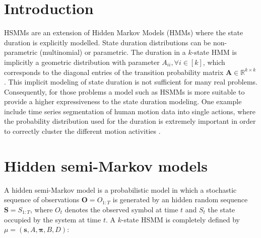 \documentclass[extendedabs]{recpad2k}
\begin{document}
\section{Introduction}
\label{sec:intro}
HSMMs are an extension of Hidden Markov Models (HMMs) where the state duration is explicitly modelled. State duration distributions can be non-parametric (multinomial) or parametric. The duration in a $k$-state HMM is implicitly a geometric distribution with parameter $A_{ii}, \forall{i\in [k]}$, which corresponds to the diagonal entries of the transition probability matrix $\boldsymbol{A}\in \mathbb{R}^{k\times k}$. %
This implicit modeling of state duration is not sufficient for many real problems. Consequently, for those problems a model such as HSMMs is more suitable to provide a higher expressiveness to the state duration modeling. One example include time series segmentation of human motion data into single actions, where the probability distribution used for the duration is extremely important in order to correctly cluster the different motion activities \cite{nakamura2017segmenting}. %
\vspace*{-2pt}
\section{Hidden semi-Markov models}
\label{sec:hsmm}
A hidden semi-Markov model is a probabilistic model in which a stochastic sequence of observations $\textbf{O}=O_{1:T}$ is generated by an hidden random sequence $\textbf{S} = S_{1:T}$, where $O_t$ denotes the observed symbol at time $t$ and $S_t$ the state occupied by the system at time $t$. A $k$-state HSMM is completely defined by $\mu=(\mathbf{s}, A, \boldsymbol{\pi}, B, D)$:
\end{document}
